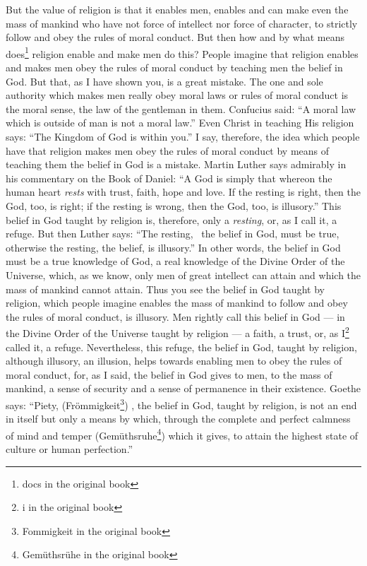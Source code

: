 But the value of religion is that it enables men, enables and can make even the mass of mankind who have not force of intellect nor force of character, to strictly follow and obey the rules of moral conduct.
But then how and by what means does\footnote{docs in the original book} religion enable and make men do this?
People imagine that religion enables and makes men obey the rules of moral conduct by teaching men the belief in God.
But that, as I have shown you, is a great mistake.
The one and sole authority which makes men really obey moral laws or rules of moral conduct is the moral sense, the law of the gentleman in them.
Confucius said: ``A moral law which is outside of man is not a moral law.''
Even Christ in teaching His religion says: ``The Kingdom of God is within you.''
I say, therefore, the idea which people have that religion makes men obey the rules of moral conduct by means of teaching them the belief in God is a mistake.
Martin Luther  says admirably in his commentary on the Book of Daniel:  ``A God is simply that whereon the human heart \emph{rests} with trust, faith, hope and love. If the resting is right, then the God, too, is right; if the resting is wrong, then the God, too, is illusory.''
This belief in God taught by religion is, therefore, only a \emph{resting}, or, as I call it, a refuge.
But then Luther says: ``The resting, \ie\, the belief in God, must be true, otherwise the resting, the belief, is illusory.''
In other words, the belief in God must be a true knowledge of God, a real knowledge of the Divine Order of the Universe, which, as we know, only men of great intellect can attain and which the mass of mankind cannot attain.
Thus you see the belief in God taught by religion, which people imagine enables the mass of mankind to follow and obey the rules of moral conduct, is illusory.
Men rightly call this belief in God --- in the Divine Order of the Universe taught by religion --- a faith, a trust, or, as I\footnote{i in the original book} called it, a refuge.
Nevertheless, this refuge, the belief in God, taught by religion, although illusory, an illusion, helps towards enabling men to obey the rules of moral conduct, for, as I said, the belief in God gives to men, to the mass of mankind, a sense of security and a sense of permanence in their existence.
Goethe says: ``Piety, (Fr\"ommigkeit\footnote{Fommigkeit in the original book}) \ie, the belief in God, taught by religion, is not an end in itself but only a means by which, through the complete and perfect calmness of mind and temper (Gem\"uthsruhe\footnote{Gem\"uthsr\"uhe in the original book}) which it gives, to attain the highest state of culture or human perfection.''
